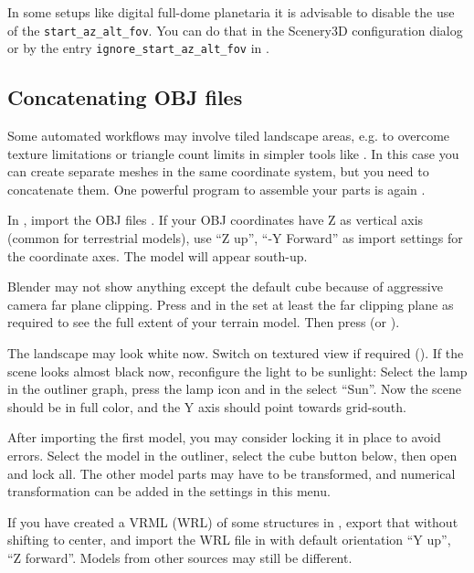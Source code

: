 In some setups like digital full-dome planetaria 
it is advisable to disable the use of the \texttt{start\_az\_alt\_fov}. 
You can do that in the Scenery3D configuration dialog or by the entry \texttt{ignore\_start\_az\_alt\_fov} in .

\subsection{Concatenating OBJ files}
\label{sec:scenery3d:concatenating}

Some automated workflows may involve tiled landscape areas, e.g. to
overcome texture limitations or triangle count limits in simpler tools
like . In this case you can create separate meshes
in the same coordinate system, but you need to concatenate them. One
powerful program to assemble your parts is again .

In , import the OBJ files . If your OBJ coordinates have Z as vertical axis (common for
terrestrial models), use ``Z up'', ``-Y Forward'' as import settings
for the coordinate axes. The model will appear south-up.

Blender may not show anything except the default cube because of
aggressive camera far plane clipping.  Press  and in the
 set at least the far clipping plane as required to see the full
extent of your terrain model. Then press  (or ).



The landscape may look white now. Switch on textured view if required
(). If the scene looks almost black now, reconfigure the
light to be sunlight: Select the lamp in the outliner graph, press the
lamp icon and in the  select ``Sun''. Now the scene should
be in full color, and the Y axis should point towards grid-south.

After importing the first model, you may consider locking it in place
to avoid errors. Select the model in the outliner, select the cube
button below, then open  and lock all. The other
model parts may have to be transformed, and numerical transformation
can be added in the  settings in this menu.

If you have created a VRML (WRL) of some structures in ,
export that without shifting to center, and import the WRL file in
 with default orientation ``Y up'', ``Z
forward''. Models from other sources may still be different.

